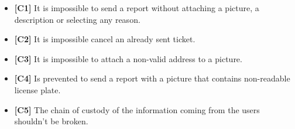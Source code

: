 \begin{itemize}
		\item \textbf{[\hypertarget{C1}{C1}]} It is impossible to send a report without attaching a picture, a description or selecting any reason. 
		\item \textbf{[\hypertarget{C2}{C2}]} It is impossible cancel an already sent ticket. 
		\item \textbf{[\hypertarget{C3}{C3}]} It is impossible to attach a non-valid address to a picture. %
		\item \textbf{[\hypertarget{C4}{C4}]} Is prevented to send a report with a picture that contains non-readable license plate. 
		\item \textbf{[\hypertarget{C5}{C5}]} The chain of custody of the information coming from the users shouldn't be broken. %
		
	\end{itemize}
